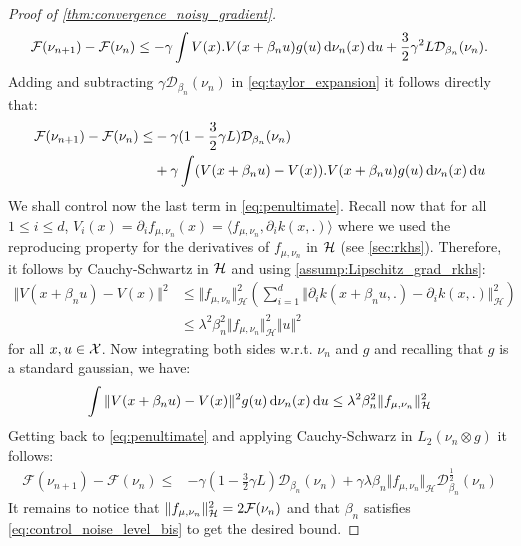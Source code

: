\begin{proof}[Proof of \cref{thm:convergence_noisy_gradient}]
	\begin{align}\label{eq:taylor_expansion}
	\mathcal{F}(\nu_{n+1})-\mathcal{F}(\nu_{n})
	\leq -\gamma \int V(x).V(x+\beta_n u) g(u)\mathop{}\!\mathrm{d}\nu_n(x)\mathop{}\!\mathrm{d} u + \frac{3}{2}\gamma^2L \mathcal{D}_{\beta_n}(\nu_n).
	\end{align} 
Adding and subtracting  $\gamma \mathcal{D}_{\beta_n}(\nu_n)$ in \cref{eq:taylor_expansion} it follows directly that:
\begin{align}\label{eq:penultimate}
\begin{split}
			\mathcal{F}(\nu_{n+1})-\mathcal{F}(\nu_{n} )\leq &   -\gamma (1-\frac{3}{2}\gamma L )\mathcal{D}_{\beta_n}(\nu_n)
 \\
 &+ \gamma\int  (V(x+\beta_n u) -V(x)).V(x+\beta_n u) g(u)\mathop{}\!\mathrm{d}\nu_n(x)\mathop{}\!\mathrm{d} u	
\end{split}
\end{align}
We shall control now the last term in \cref{eq:penultimate}. Recall now that for all $1\le i\le d$, $ V_i(x) = \partial_i f_{\mu,\nu_n}(x) = \langle f_{\mu,\nu_n} , \partial_i k(x,.)\rangle $ where we used the reproducing property for the derivatives of $f_{\mu,\nu_n}$ in ${{\mathcal H}}$ (see \cref{sec:rkhs}). Therefore, it follows by Cauchy-Schwartz in ${{\mathcal H}}$ and using \cref{assump:Lipschitz_grad_rkhs}:
\begin{align*}
\Vert V(x+\beta_n u) -V(x)\Vert^2
&\leq 
\Vert f_{\mu,\nu_n} \Vert_{\mathcal{H}}^2  \left( \sum_{i=1}^{d}\Vert \partial_i k(x+\beta_n u,.) -\partial_i k(x,.)\Vert^2_{\mathcal{H}}\right)\\
&\leq \lambda^2\beta_n^2
\Vert   f_{\mu,\nu_n}\Vert_{\mathcal{H}}^2\Vert u \Vert^2 
\end{align*}
for all $ x,u \in {{\mathcal X}}$. Now integrating both sides w.r.t. $\nu_n$ and $g$ and recalling that $g$ is a standard gaussian, we have:
\begin{align}
	 \int  \Vert V(x+\beta_n u) -V(x)\Vert^2 g(u)\mathop{}\!\mathrm{d}\nu_n(x)\mathop{}\!\mathrm{d} u
\leq 
	\lambda^2\beta^2_n\Vert f_{\mu,\nu_n} \Vert_{\mathcal{H}}^2
\end{align}
Getting back to \cref{eq:penultimate} and applying Cauchy-Schwarz in $L_2(\nu_n\otimes g)$ it follows:
\begin{align}
	\mathcal{F}(\nu_{n+1})-\mathcal{F}(\nu_{n} )\leq &   -\gamma (1-\frac{3}{2}\gamma L )\mathcal{D}_{\beta_n}(\nu_n) +\gamma \lambda\beta_n\Vert f_{\mu,\nu_n} \Vert_{\mathcal{H}}\mathcal{D}^{\frac{1}{2}}_{\beta_n}(\nu_n)
\end{align}
It remains to notice that $\Vert f_{\mu,\nu_n} \Vert_{\mathcal{H}}^2 = 2{{\mathcal F}}(\nu_n)$ and that $\beta_n$ satisfies \cref{eq:control_noise_level_bis} to get the desired bound.
\end{proof}

